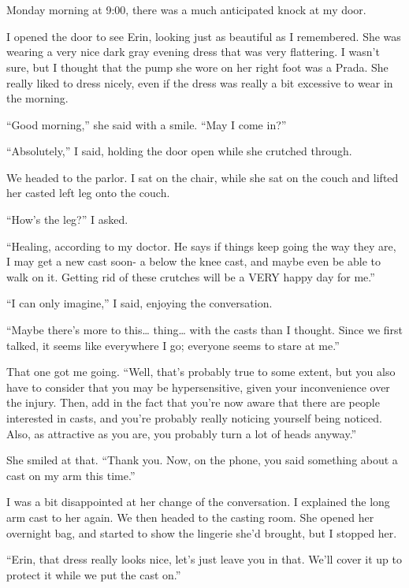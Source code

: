 \chapter{~}
Monday morning at 9:00, there was a much anticipated knock at my door.

I opened the door to see Erin, looking just as beautiful as I remembered. She was wearing a
very nice dark gray evening dress that was very flattering. I wasn't sure, but I thought that
the pump she wore on her right foot was a Prada. She really liked to dress nicely, even if the
dress was really a bit excessive to wear in the morning.

``Good morning,'' she said with a smile. ``May I come in?''

``Absolutely,'' I said, holding the door open while she crutched through.

We headed to the parlor. I sat on the chair, while she sat on the couch and lifted her
casted left leg onto the couch.

``How's the leg?'' I asked.

``Healing, according to my doctor. He says if things keep going the way they are, I may get
a new cast soon- a below the knee cast, and maybe even be able to walk on it. Getting rid of
these crutches will be a VERY happy day for me.''

``I can only imagine,'' I said, enjoying the conversation.

``Maybe there's more to this… thing… with the casts than I thought. Since we first talked,
it seems like everywhere I go; everyone seems to stare at me.''

That one got me going. ``Well, that's probably true to some extent, but you also have to
consider that you may be hypersensitive, given your inconvenience over the injury. Then, add in
the fact that you're now aware that there are people interested in casts, and you're probably
really noticing yourself being noticed. Also, as attractive as you are, you probably turn a lot
of heads anyway.''

She smiled at that. ``Thank you. Now, on the phone, you said something about a cast on my
arm this time.''

I was a bit disappointed at her change of the conversation. I explained the long arm cast to
her again. We then headed to the casting room. She opened her overnight bag, and started to show
the lingerie she'd brought, but I stopped her.

``Erin, that dress really looks nice, let's just leave you in that. We'll cover it up to
protect it while we put the cast on.''

